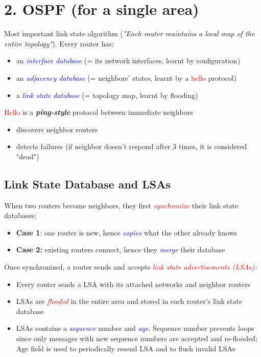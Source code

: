 \documentclass[11pt]{article}
\begin{document}
\section*{2. OSPF (for a single area)}

Most important link state algorithm (\textit{"Each router maintains a local map of the entire topology"}). Every router has:
\begin{itemize}
	\item an \textcolor{blue}{\textit{interface database}} (= its network interfaces, learnt by configuration)
	\item an \textcolor{blue}{\textit{adjacency database}} (= neighbors' states, learnt by a \textcolor{red}{hello} protocol)
	\item a \textcolor{blue}{\textit{link state database}} (= topology map, learnt by flooding)
\end{itemize}

\textcolor{red}{Hello} is a \textbf{\textit{ping-style}} protocol between immediate neighbors
\begin{itemize}
	\item discovers neighbor routers
	\item detects failures (if neighbor doesn't respond after 3 times, it is considered "dead")
\end{itemize}

\subsection*{Link State Database and LSAs}

When two routers become neighbors, they first \textcolor{red}{\textit{synchronize}} their link state databases:
\begin{itemize}
	\item \textbf{Case 1}: one router is new, hence \textcolor{blue}{\textit{copies}} what the other already knows
	\item \textbf{Case 2:} existing routers connect, hence they \textcolor{blue}{\textit{merge}} their database
\end{itemize}

Once synchronized, a router sends and accepts \textcolor{red}{\textit{link state advertisements (LSAs):}}
\begin{itemize}
	\item Every router sends a LSA with its attached networks and neighbor routers
	\item LSAs are \textcolor{red}{\textit{flooded}} in the entire area and stored in each router's link state database
	\item LSAs contains a \textcolor{blue}{\textit{sequence}} number and \textcolor{blue}{\textit{age}}. Sequence number prevents loops since only messages with new sequence numbers are accepted and re-flooded; Age field is used to periodically resend LSA and to flush invalid LSAs
\end{itemize}
\end{document}
